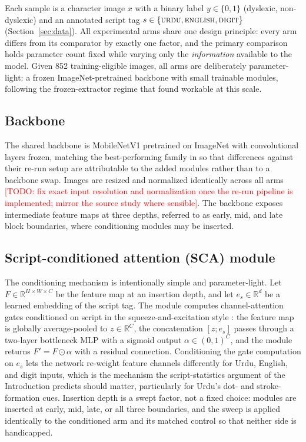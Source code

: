 \documentclass[11pt,a4paper]{article}
\newcommand{\todonote}[1]{\textcolor{red}{[TODO: #1]}}
\begin{document}
Each sample is a character image $x$ with a binary label
$y \in \{0,1\}$ (dyslexic, non-dyslexic) and an annotated script tag
$s \in \{\textsc{urdu}, \textsc{english}, \textsc{digit}\}$
(Section~\ref{sec:data}). All experimental arms share one design
principle: every arm differs from its comparator by exactly one
factor, and the primary comparison holds parameter count fixed while
varying only the \emph{information} available to the model. Given 852
training-eligible images, all arms are deliberately parameter-light:
a frozen ImageNet-pretrained backbone with small trainable modules,
following the frozen-extractor regime that \citet{kashif2026} found
workable at this scale.

\subsection{Backbone}

The shared backbone is MobileNetV1 pretrained on ImageNet with
convolutional layers frozen, matching the best-performing family in
\citet{kashif2026} so that differences against their re-run setup are
attributable to the added modules rather than to a backbone swap.
Images are resized and normalized identically across all arms
\todonote{fix exact input resolution and normalization once the
re-run pipeline is implemented; mirror the source study where
sensible}. The backbone exposes intermediate feature maps at three
depths, referred to as early, mid, and late block boundaries, where
conditioning modules may be inserted.

\subsection{Script-conditioned attention (SCA) module}

The conditioning mechanism is intentionally simple and
parameter-light. Let $F \in \mathbb{R}^{H \times W \times C}$ be the
feature map at an insertion depth, and let
$e_s \in \mathbb{R}^{d}$ be a learned embedding of the script tag.
The module computes channel-attention gates conditioned on script in
the squeeze-and-excitation style \citep{hu2018squeeze}: the feature
map is globally average-pooled to $z \in \mathbb{R}^{C}$, the
concatenation $[z; e_s]$ passes through a two-layer bottleneck MLP
with a sigmoid output $\alpha \in (0,1)^{C}$, and the module returns
$F' = F \odot \alpha$ with a residual connection. Conditioning the
gate computation on $e_s$ lets the network re-weight feature channels
differently for Urdu, English, and digit inputs, which is the
mechanism the script-statistics argument of the Introduction
predicts should matter, particularly for Urdu's dot- and
stroke-formation cues. Insertion depth is a swept factor, not a fixed
choice: modules are inserted at early, mid, late, or all three
boundaries, and the sweep is applied identically to the conditioned
arm and its matched control so that neither side is handicapped.
\end{document}
